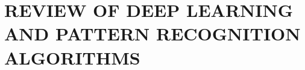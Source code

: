 \documentclass[14pt,epsfig,times]{report}
\begin{document}
\chapter{REVIEW OF DEEP LEARNING AND PATTERN RECOGNITION ALGORITHMS}\label{ch3}


%

%

%
%

%
\end{document}
